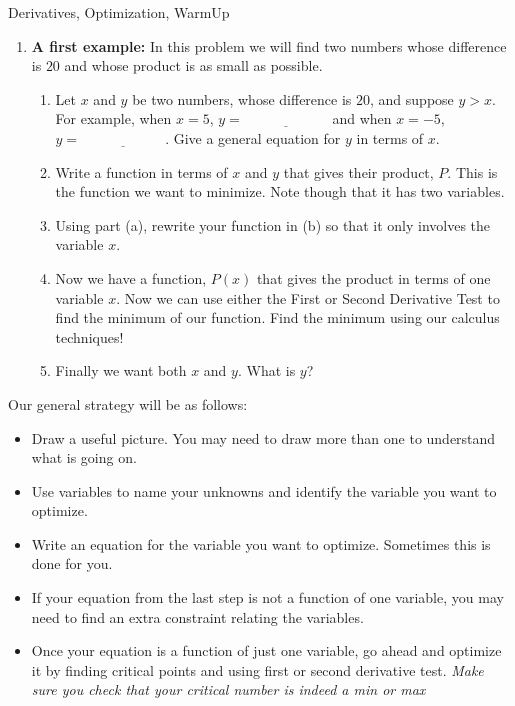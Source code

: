 \begin{tagblock}{Derivatives, Optimization, WarmUp}

\begin{question}

\begin{enumerate}
\item \textbf{A first example:}  In this problem we will find two numbers whose difference is $20$ and whose product is as small as possible. 
\begin{enumerate}
\item Let $x$ and $y$ be two numbers, whose difference is $20$, and suppose $y>x$.    For example, when $x=5$, $y=\underline{\hspace{1in}}$ and when $x=-5$, $y=\underline{\hspace{1in}}$.  Give a general equation for $y$ in terms of $x$.
\vspace{.5in}

\item Write a function in terms of $x$ and $y$ that gives their product, $P$.  This is the function we want to minimize.  Note though that it has two variables.
\vspace{.5in}
\item  Using part (a),  rewrite your function in (b) so that it only involves the variable $x$.
\vspace{.5in}
\item Now we have a function, $P(x)$ that gives the product in terms of one variable $x$.  Now we can use either the First or Second Derivative Test to find the minimum of our function.  Find the minimum using our calculus techniques!
\vspace{2in}
\item Finally we want both $x$ and $y$.  What is $y$?


\end{enumerate}
\end{enumerate}

\newpage

Our general strategy will be as follows:
\begin{itemize}
\item Draw a useful picture. You may need to draw more than one to understand what is going on.
\item Use variables to name your unknowns and identify the variable you want to optimize. 
\item Write an equation for the variable you want to optimize. Sometimes this is done for you.
\item If your equation from the last step is not a function of one variable, you may need to find an extra constraint relating the variables.
\item Once your equation is a function of just one variable, go ahead and optimize it by finding critical points and using first or second derivative test. \emph{Make sure you check that your critical number is indeed a min or max}
\end{itemize}




\end{question}
\end{tagblock}

